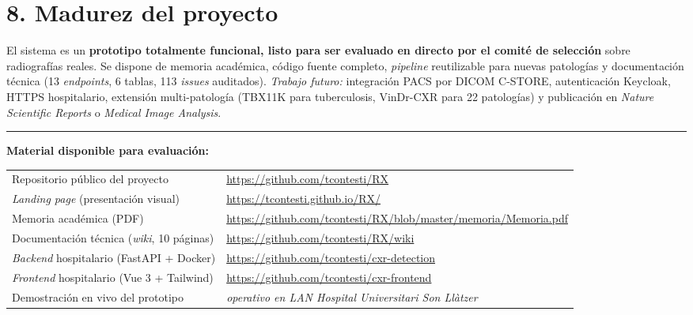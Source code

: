 \documentclass[11pt,a4paper]{article}
\begin{document}
\section*{8. Madurez del proyecto}

El sistema es un \textbf{prototipo totalmente funcional, listo para ser evaluado en directo por el comité de selección} sobre radiografías reales. Se dispone de memoria académica, código fuente completo, \emph{pipeline} reutilizable para nuevas patologías y documentación técnica (13 \emph{endpoints}, 6 tablas, 113 \emph{issues} auditados). \emph{Trabajo futuro:} integración PACS por DICOM C-STORE, autenticación Keycloak, HTTPS hospitalario, extensión multi-patología (TBX11K para tuberculosis, VinDr-CXR para 22 patologías) y publicación en \emph{Nature Scientific Reports} o \emph{Medical Image Analysis}.

\vspace{2pt}
\hrule
\vspace{3pt}

{\small
\textbf{Material disponible para evaluación:}\\[1pt]
\begin{tabular}{@{}ll@{}}
Repositorio público del proyecto & \url{https://github.com/tcontesti/RX} \\
\emph{Landing page} (presentación visual) & \url{https://tcontesti.github.io/RX/} \\
Memoria académica (PDF) & \url{https://github.com/tcontesti/RX/blob/master/memoria/Memoria.pdf} \\
Documentación técnica (\emph{wiki}, 10 páginas) & \url{https://github.com/tcontesti/RX/wiki} \\
\emph{Backend} hospitalario (FastAPI + Docker) & \url{https://github.com/tcontesti/cxr-detection} \\
\emph{Frontend} hospitalario (Vue 3 + Tailwind) & \url{https://github.com/tcontesti/cxr-frontend} \\
Demostración en vivo del prototipo & \emph{operativo en LAN Hospital Universitari Son Llàtzer} \\
\end{tabular}}
\end{document}
